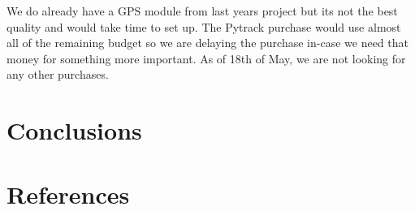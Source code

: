 \documentclass[a4paper,12pt]{article}
\begin{document}
We do already have a GPS module from last years project but its not the best quality and would take time to set up. The Pytrack purchase would use almost all of the remaining budget so we are delaying the purchase in-case we need that money for something more important. As of 18th of May, we are not looking for any other purchases.

\clearpage

\section{Conclusions}
\clearpage
\section{References}
\end{document}

